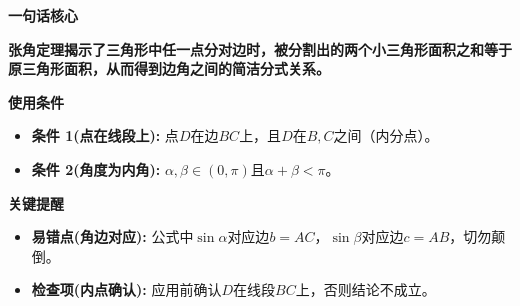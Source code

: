 \begin{summarybox}
	\textbf{\textcolor{CSummary}{一句话核心}}

	\textbf{张角定理揭示了三角形中任一点分对边时，被分割出的两个小三角形面积之和等于原三角形面积，从而得到边角之间的简洁分式关系。}

	\medskip
	\textbf{\textcolor{CSummary}{使用条件}}
	\begin{itemize}[leftmargin=*, itemsep=0.5em, topsep=0.4em]
		\item \textbf{条件 1(点在线段上):} 点$D$在边$BC$上，且$D$在$B,C$之间（内分点）。
		\item \textbf{条件 2(角度为内角):} $\alpha,\beta\in(0,\pi)$且$\alpha+\beta<\pi$。
	\end{itemize}

	\medskip
	\textbf{\textcolor{CSummary}{关键提醒}}
	\begin{itemize}[leftmargin=*, itemsep=0.5em, topsep=0.4em]
		\item \textbf{易错点(角边对应):} 公式中$\sin\alpha$对应边$b=AC$，$\sin\beta$对应边$c=AB$，切勿颠倒。
		\item \textbf{检查项(内点确认):} 应用前确认$D$在线段$BC$上，否则结论不成立。
	\end{itemize}
\end{summarybox}
